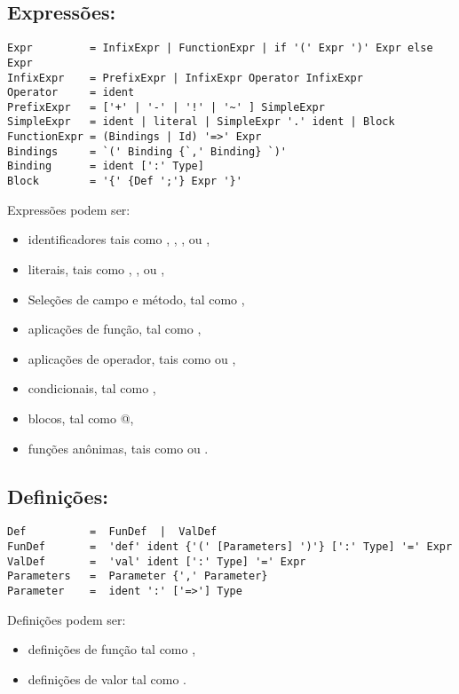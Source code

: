 \subsection*{Express\~{o}es:}
\begin{lstlisting}
Expr         = InfixExpr | FunctionExpr | if '(' Expr ')' Expr else Expr
InfixExpr    = PrefixExpr | InfixExpr Operator InfixExpr
Operator     = ident
PrefixExpr   = ['+' | '-' | '!' | '~' ] SimpleExpr
SimpleExpr   = ident | literal | SimpleExpr '.' ident | Block
FunctionExpr = (Bindings | Id) '=>' Expr
Bindings     = `(' Binding {`,' Binding} `)'
Binding      = ident [':' Type]
Block        = '{' {Def ';'} Expr '}'
\end{lstlisting}

Express\~{o}es podem ser:
 \begin{itemize}
 \item
identificadores tais como , , \code{*}, ou \code{+-},
 \item
literais, tais como , , ou ,
 \item
Sele\c{c}\~{o}es de campo e m\'{e}todo, tal como ,
 \item
aplica\c{c}\~{o}es de fun\c{c}\~{a}o, tal como ,
 \item
aplica\c{c}\~{o}es de operador, tais como  ou ,
 \item
condicionais, tal como ,
 \item
blocos, tal como @,
 \item
fun\c{c}\~{o}es an\^{o}nimas, tais como  ou .
 \end{itemize}

\subsection*{Defini\c{c}\~{o}es:}
\begin{lstlisting}
Def          =  FunDef  |  ValDef
FunDef       =  'def' ident {'(' [Parameters] ')'} [':' Type] '=' Expr
ValDef       =  'val' ident [':' Type] '=' Expr
Parameters   =  Parameter {',' Parameter}
Parameter    =  ident ':' ['=>'] Type
\end{lstlisting}
Defini\c{c}\~{o}es podem ser:
\begin{itemize}
\item
defini\c{c}\~{o}es de fun\c{c}\~{a}o tal como ,
\item
defini\c{c}\~{o}es de valor tal como .
\end{itemize}

